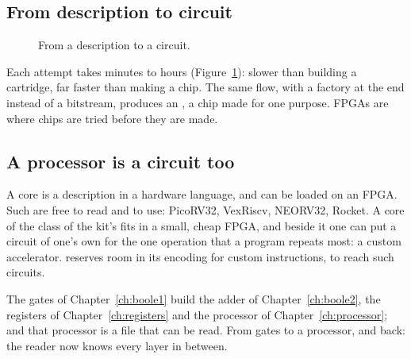 \subsection{From description to circuit}

\begin{figure}[htb]
\centering
{}
\caption{From a description to a circuit.}
\label{fig:by:fpgaflow}
\end{figure}

Each attempt takes minutes to hours (Figure~\ref{fig:by:fpgaflow}): slower
than building a cartridge, far faster than making a chip. The same flow,
with a factory at the end instead of a bitstream, produces an , a
chip made for one purpose. FPGAs are where chips are tried before they are
made.

\subsection{A processor is a circuit too}

A \riscv core is a description in a hardware language, and can be loaded on
an FPGA. Such  are free to read and to use: PicoRV32,
VexRiscv, NEORV32, Rocket. A core of the class of the kit's fits in a small,
cheap FPGA, and beside it one can put a circuit of one's own for the one
operation that a program repeats most: a custom accelerator. \riscv reserves
room in its encoding for custom instructions, to reach such circuits.

\begin{prgconcept}
The gates of Chapter~\ref{ch:boole1} build the adder of
Chapter~\ref{ch:boole2}, the registers of Chapter~\ref{ch:registers}
and the processor of Chapter~\ref{ch:processor}; and that processor is a file
that can be read. From gates to a processor, and back: the reader now knows
every layer in between.
\end{prgconcept}

